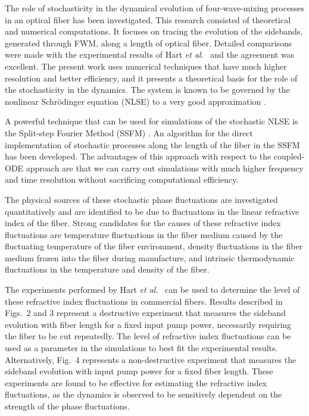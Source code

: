 The role of stochasticity in the dynamical evolution of four-wave-mixing
processes in an optical fiber has been investigated. This research consisted
of theoretical and numerical computations. It focuses on tracing the evolution
of the sidebands, generated through FWM, along a length of optical fiber.
Detailed comparisons were made with the experimental results of
Hart {\it et al}.\ \cite{hart1} and the agreement was excellent. The present work
uses numerical techniques that have much higher resolution and better
efficiency, and it presents a theoretical basis for the role of the
stochasticity in the dynamics. The system is known to be governed by the
nonlinear Schr\"odinger equation (NLSE) to a very good
approximation \cite{Agrawal2}.

A powerful technique that can be used for simulations of the stochastic NLSE
is the Split-step Fourier Method (SSFM) \cite{Agrawal2}. An algorithm for the
direct implementation of stochastic processes along the length of the fiber in
the SSFM has been developed. The advantages of this approach with respect to
the coupled-ODE approach are that we can carry out simulations with much
higher frequency and time resolution without sacrificing computational
efficiency.

The physical sources of these stochastic phase fluctuations are investigated
quantitatively and are identified to be due to fluctuations in the linear
refractive index of the fiber. Strong candidates for the causes of these
refractive index fluctuations are temperature fluctuations in the fiber medium
caused by the fluctuating temperature of the fiber environment, density
fluctuations in the fiber medium frozen into the fiber during manufacture, and
intrinsic thermodynamic fluctuations in the temperature and density of the
fiber.

The experiments performed by Hart {\it et al}.\ \cite{hart1} can be used to
determine the level of these refractive index fluctuations in commercial
fibers. Results described in Figs.\ 2 and 3 represent a destructive
experiment that measures the sideband evolution with fiber length for a fixed
input pump power, necessarily requiring the fiber to be cut repeatedly. The
level of refractive index fluctuations can be used as a parameter in the
simulations to best fit the experimental results. Alternatively, Fig.\ 4
represents a non-destructive experiment that measures the sideband evolution
with input pump power for a fixed fiber length. These experiments are found to
be effective for estimating the refractive index fluctuations, as the dynamics
is observed to be sensitively dependent on the strength of the phase
fluctuations.
